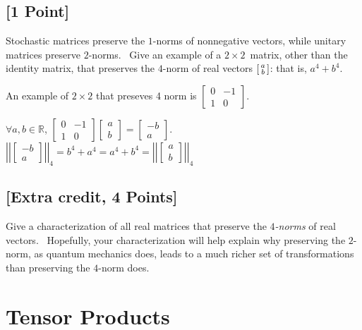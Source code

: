 \documentclass[11pt]{article}
\newcommand{\abs}[1]{\left\lvert #1\right\rvert}
\begin{document}
\subsection{[1 Point]} Stochastic matrices preserve the $1$-norms of nonnegative vectors, while
unitary matrices preserve $2$-norms. \ Give an example of a $2\times
2$\ matrix, other than the identity matrix, that preserves the $4$-norm of
real vectors $\begin{bsmallmatrix} a\\b\end{bsmallmatrix}$: that is, $a^{4}+b^{4}$.

\begin{solution}
	An example of $2 \times 2$ that preseves 4 norm is $\begin{bmatrix}
		0 & -1 \\ 1 & 0
	\end{bmatrix}$. 
	
	$\forall a, b \in \mathbb{R}$, $\begin{bmatrix}
		0 & -1 \\ 1 & 0
	\end{bmatrix}\begin{bmatrix}
		a \\ b
	\end{bmatrix} = \begin{bmatrix}
		-b \\ a
	\end{bmatrix}$. $\abs{\abs{\begin{bmatrix}
		-b \\ a
	\end{bmatrix}}}_{4} = b^4 + a^4 = a^4 + b^4 = \abs{\abs{\begin{bmatrix}
		a \\ b
	\end{bmatrix}}}_4$   
\end{solution}

\subsection{[Extra credit, 4 Points]} Give a characterization of all real matrices that preserve the
$4$\textit{-norms} of real vectors. \ Hopefully, your characterization will
help explain why preserving the $2$-norm, as quantum mechanics does, leads to
a much richer set of transformations than preserving the $4$-norm does.



\section{Tensor Products}
\end{document}
